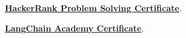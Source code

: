 \begin{zitemize}
    \item \href{https://www.hackerrank.com/certificates/7e492a2e11be}{\textbf{HackerRank Problem Solving Certificate}}.
    \item \href{https://academy.langchain.com/certificates/vkkkoij3ke}{\textbf{LangChain Academy Certificate}}.
\end{zitemize}
